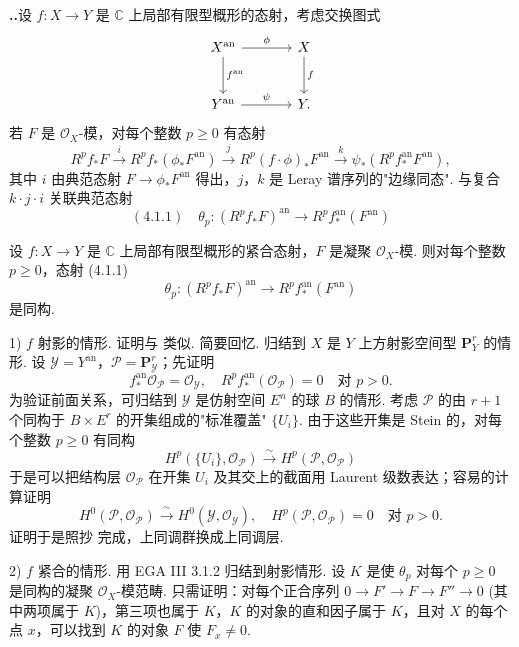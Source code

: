 \noindent\textbf{\thesection..}\quad 设 $f \colon X \to Y$ 是 $\mathbb{C}$ 上局部有限型概形的态射，考虑交换图式
\[
\begin{tikzcd}[row sep=large, column sep=large]
X^{\mathrm{an}} \arrow[r,"{\phi}"] \arrow[d,"{f^{\mathrm{an}}}"] & X \arrow[d,"{f}"] \\
Y^{\mathrm{an}} \arrow[r,"{\psi}"] & Y.
\end{tikzcd}
\]
若 $F$ 是 $\mathcal{O}_X$-模，对每个整数 $p \geqslant 0$ 有态射
\[
R^p f_* F \xrightarrow{i} R^p f_*(\phi_* F^{\mathrm{an}}) \xrightarrow{j} R^p (f \cdot \phi)_* F^{\mathrm{an}} \xrightarrow{k} \psi_* (R^p f_*^{\mathrm{an}} F^{\mathrm{an}}),
\]
其中 $i$ 由典范态射 $F \to \phi_* F^{\mathrm{an}}$ 得出，$j$，$k$ 是 Leray 谱序列的"边缘同态". 与复合 $k \cdot j \cdot i$ 关联典范态射
\[
(4.1.1) \quad \theta_p \colon (R^p f_* F)^{\mathrm{an}} \longrightarrow R^p f_*^{\mathrm{an}} (F^{\mathrm{an}})
\]

\begin{theorem}\label{thm:XII.4.2}
设 $f \colon X \to Y$ 是 $\mathbb{C}$ 上局部有限型概形的紧合态射，$F$ 是凝聚 $\mathcal{O}_X$-模. 则对每个整数 $p \geqslant 0$，态射 (4.1.1)
\[
\theta_p \colon (R^p f_* F)^{\mathrm{an}} \longrightarrow R^p f_*^{\mathrm{an}} (F^{\mathrm{an}})
\]
是同构.
\end{theorem}

1) $f$ 射影的情形. 证明与 \cite[第 13 号]{exp12-10} 类似. 简要回忆. 归结到 $X$ 是 $Y$ 上方射影空间型 $\mathbf{P}^r_Y$ 的情形. 设 $\mathcal{Y} = Y^{\mathrm{an}}$，$\mathcal{P} = \mathbf{P}^r_\mathcal{Y}$；先证明
\[
f_*^{\mathrm{an}} \mathcal{O}_{\mathcal{P}} = \mathcal{O}_{\mathcal{Y}}, \quad R^p f_*^{\mathrm{an}}(\mathcal{O}_{\mathcal{P}}) = 0 \quad \text{对 } p > 0.
\]
为验证前面关系，可归结到 $\mathcal{Y}$ 是仿射空间 $E^n$ 的球 $B$ 的情形. 考虑 $\mathcal{P}$ 的由 $r + 1$ 个同构于 $B \times E^r$ 的开集组成的"标准覆盖" $\{U_i\}$. 由于这些开集是 Stein 的，对每个整数 $p \geqslant 0$ 有同构
\[
H^p(\{U_i\}, \mathcal{O}_{\mathcal{P}}) \xrightarrow{\sim} H^p(\mathcal{P}, \mathcal{O}_{\mathcal{P}})
\]
于是可以把结构层 $\mathcal{O}_{\mathcal{P}}$ 在开集 $U_i$ 及其交上的截面用 Laurent 级数表达；容易的计算证明
\[
H^0(\mathcal{P}, \mathcal{O}_{\mathcal{P}}) \xrightarrow{\sim} H^0(\mathcal{Y}, \mathcal{O}_{\mathcal{Y}}), \quad H^p(\mathcal{P}, \mathcal{O}_{\mathcal{P}}) = 0 \quad \text{对 } p > 0.
\]
证明于是照抄 \cite[第 12 号 引理 5]{exp12-10} 完成，上同调群换成上同调层.

2) $f$ 紧合的情形. 用 EGA III 3.1.2 归结到射影情形. 设 $K$ 是使 $\theta_p$ 对每个 $p \geqslant 0$ 是同构的凝聚 $\mathcal{O}_X$-模范畴. 只需证明：对每个正合序列 $0 \to F' \to F \to F'' \to 0$ (其中两项属于 $K$)，第三项也属于 $K$，$K$ 的对象的直和因子属于 $K$，且对 $X$ 的每个点 $x$，可以找到 $K$ 的对象 $F$ 使 $F_x \neq 0$.

